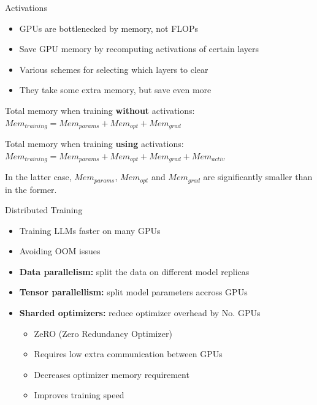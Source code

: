 
\begin{vbframe}{Activations}

\vfill

\begin{itemize}
 	\item GPUs are bottlenecked by memory, not FLOPs
 	\item Save GPU memory by recomputing activations of certain layers
	\item Various schemes for selecting which layers to clear
	\item They take some extra memory, but save even more
\end{itemize}

\vskip5mm

Total memory when training \textbf{without} activations: \newline
$Mem_{training} = Mem_{params} + Mem_{opt} + Mem_{grad}$

\vskip5mm

Total memory when training \textbf{using} activations: \newline
$Mem_{training} = Mem_{params} + Mem_{opt} + Mem_{grad} + Mem_{activ}$

\vskip5mm

In the latter case, $Mem_{params}$, $Mem_{opt}$ and $Mem_{grad}$ are significantly smaller than in the former.

\vfill

\end{vbframe}


\begin{vbframe}{Distributed Training}

\vfill

\begin{itemize}
 	\item Training LLMs faster on many GPUs
 	\item Avoiding OOM issues
	\item \textbf{Data parallelism:} split the data on different model replicas
	\item \textbf{Tensor parallellism:} split model parameters accross GPUs
	\item \textbf{Sharded optimizers:} reduce optimizer overhead by No. GPUs
	\begin{itemize}
	 	\item ZeRO (Zero Redundancy Optimizer)
		\item Requires low extra communication between GPUs
	 	\item Decreases optimizer memory requirement
		\item Improves training speed
\end{itemize}
\end{itemize}

\vfill

\end{vbframe}

